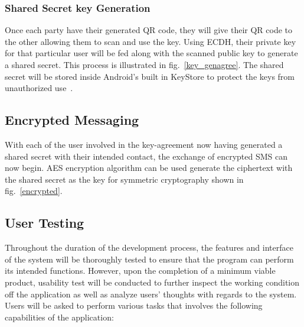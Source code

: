 \documentclass[journal]{./IEEE/IEEEtran}
\begin{document}
\subsubsection{Shared Secret key Generation}
Once each party have their generated QR code, they will give their QR code to
the other allowing them to scan and use the key. Using ECDH, their private key
for that particular user will be fed along with the scanned public key to
generate a shared secret. This process is illustrated in fig.~\ref{key_genagree}.
The shared secret will be stored inside Android's built in KeyStore to protect
the keys from unauthorized use~\cite{android_keystore}.

\subsection{Encrypted Messaging}
With each of the user involved in the key-agreement now having generated a
shared secret with their intended contact, the exchange of encrypted SMS
can now begin. AES encryption algorithm can be used generate the ciphertext
with the shared secret as the key for symmetric cryptography shown in
fig.~\ref{encrypted}.


\subsection{User Testing}
Throughout the duration of the development process, the features and interface
of the system will be thoroughly tested to ensure that the program can perform
its intended functions. However, upon the completion of a minimum viable
product, usability test will be conducted to further inspect the working
condition off the application as well as analyze users' thoughts with regards
to the system. Users will be asked to perform various tasks that involves the
following capabilities of the application:
\end{document}
